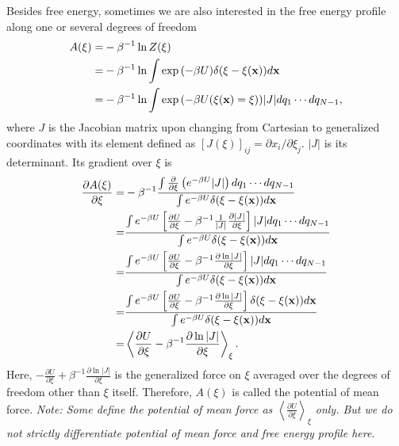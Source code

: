 Besides free energy, sometimes we are also interested in the free energy profile along one or several degrees of freedom
\begin{align}
	A(\xi)=&-\beta^{-1}\ln{Z(\xi)}\notag\\
	      =&-\beta^{-1}\ln\int \exp{\left(-\beta U\right)}\delta(\xi-\xi(\mathbf{x}))d\mathbf{x}\notag\\
	      =&-\beta^{-1}\ln\int \exp{\left(-\beta U(\xi(\mathbf{x})=\xi)\right)}|J|dq_1\cdots dq_{N-1},
\end{align}
where $J$ is the Jacobian matrix upon changing from Cartesian to generalized coordinates with its element defined as $\left[J(\xi)\right]_{ij}=\partial x_i/\partial \xi_j$. $|J|$ is its determinant. Its gradient over $\xi$ is
\begin{align}
\frac{\partial A(\xi)}{\partial \xi}=&-\beta^{-1}\frac{\int \frac{\partial}{\partial \xi}\left(e^{-\beta U}|J|\right)dq_1\cdots dq_{N-1}}{\int e^{-\beta U}\delta(\xi-\xi(\mathbf{x}))d\mathbf{x}}\notag\\
                                    =&\frac{\int e^{-\beta U}\left[\frac{\partial U}{\partial \xi}-\beta^{-1}\frac{1}{|J|}\frac{\partial |J|}{\partial \xi}\right]|J|dq_1\cdots dq_{N-1}}{\int e^{-\beta U}\delta(\xi-\xi(\mathbf{x}))d\mathbf{x}}\notag\\
                                    =&\frac{\int e^{-\beta U}\left[\frac{\partial U}{\partial \xi}-\beta^{-1}\frac{\partial \ln|J|}{\partial \xi}\right]|J|dq_1\cdots dq_{N-1}}{\int e^{-\beta U}\delta(\xi-\xi(\mathbf{x}))d\mathbf{x}}\notag\\
                                    =&\frac{\int e^{-\beta U}\left[\frac{\partial U}{\partial \xi}-\beta^{-1}\frac{\partial \ln|J|}{\partial \xi}\right]\delta(\xi-\xi(\mathbf{x}))d\mathbf{x}}{\int e^{-\beta U}\delta(\xi-\xi(\mathbf{x}))d\mathbf{x}}\notag\\
                                    =&\left<\frac{\partial U}{\partial \xi}-\beta^{-1}\frac{\partial \ln |J|}{\partial \xi}\right>_\xi.
\end{align}
Here, $-\frac{\partial U}{\partial \xi}+\beta^{-1}\frac{\partial \ln |J|}{\partial \xi}$ is the generalized force on $\xi$ averaged over the degrees of freedom other than $\xi$ itself. Therefore, $A(\xi)$ is called the potential of mean force. \textit{Note: Some define the potential of mean force as $\left<\frac{\partial U}{\partial \xi}\right>_\xi$ only. But we do not strictly differentiate potential of mean force and free energy profile here.}

